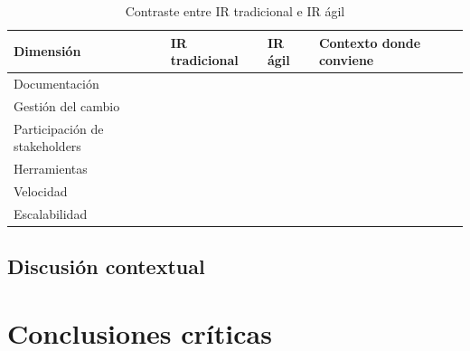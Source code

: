 \documentclass[journal,onecolumn]{IEEEtran}
\newcommand{\guia}[2]{%
	\begin{mdframed}[style=guia]
		\sloppy
		\noindent\textbf{Responsable: #1}\\[2pt]
		#2
	\end{mdframed}
}
\newif\ifguias
\let\guiaoriginal\guia
\renewcommand{\guia}[2]{\ifguias\guiaoriginal{#1}{#2}\fi}
\begin{document}
	\begin{table}[H]
		\centering
		\caption{Contraste entre IR tradicional e IR ágil}
		\begin{tabular}{L{2.6cm} L{4.2cm} L{4.2cm} L{2.4cm}}
			\toprule
			\textbf{Dimensión} & \textbf{IR tradicional} & \textbf{IR ágil} &
			\textbf{Contexto donde conviene} \\
			\midrule
			Documentación                  & & & \\
			Gestión del cambio             & & & \\
			Participación de stakeholders  & & & \\
			Herramientas                   & & & \\
			Velocidad                      & & & \\
			Escalabilidad                  & & & \\
			\bottomrule
		\end{tabular}
	\end{table}
	
	\subsection{Discusión contextual}
	
	\guia{Jonathan (Integrante 3)}{%
		Las seis dimensiones son obligatorias. Apoyarse en \texttt{cohn2004} y \texttt{smart2014}
		para la columna ágil y en \texttt{pohl2025} y \texttt{wiegers2013} para la tradicional.
		La tercera columna (contexto) es la que evita que la tabla quede «superficial» según C6.\\[3pt]
		Cerrar con un párrafo de discusión: qué enfoque habría convenido para MundiPets y por qué,
		con base en lo vivido en esta PE4. El proyecto es un caso interesante porque el ERS es
		fuertemente documental pero ya incorpora historias de usuario y criterios en Gherkin ---
		ese híbrido es material para la discusión.}
	
	\section{Conclusiones críticas}
	
	\guia{Kevin (C1, C2) -- Jonathan (C3, C4) -- Edson (C5 e integración)}{%
		Cinco conclusiones que integren los cuatro temas de la unidad:
		C1~validación e inspección Fagan; C2~métricas y calidad del ERS; C3~gestión del cambio y
		CCB; C4~trazabilidad y herramienta CASE; C5~línea base y contraste tradicional/ágil.\\[3pt]
		Una conclusión crítica \textbf{interpreta un resultado propio del equipo}: debe contener un
		dato de este informe (un número de defectos, una decisión del CCB, un hallazgo de la matriz).
		Una afirmación general de manual no cuenta y baja C6. Edson revisa que las cinco juntas
		cubran los cuatro temas sin repetirse.}
	
\end{document}
